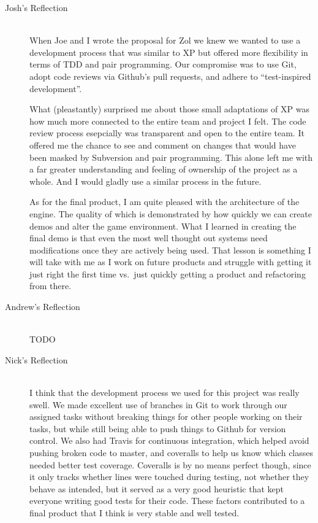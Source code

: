 \documentclass{article}
\begin{document}
		\begin{description}
			\item[Josh's Reflection] \hfill \\
			When Joe and I wrote the proposal for Zol we knew we wanted to
			use a development process that was similar to XP but offered more
			flexibility in terms of TDD and pair programming. Our compromise
			was to use Git, adopt code reviews via Github's pull requests,
			and adhere to ``test-inspired development''.

			What (pleastantly) surprised me about those small adaptations of
			XP was how much more connected to the entire team and project I
			felt. The code review process esepcially was transparent and
			open to the entire team. It offered me the chance to see and
			comment on changes that would have been masked by Subversion and
			pair programming. This alone left me with a far greater
			understanding and feeling of ownership of the project as a whole.
			And I would gladly use a similar process in the future.

			As for the final product, I am quite pleased with the architecture
			of the engine. The quality of which is demonstrated by how
			quickly we can create demos and alter the game environment. What
			I learned in creating the final demo is that even the most well
			thought out systems need modifications once they are actively
			being used. That lesson is something I will take with me as
			I work on future products and struggle with getting it just right
			the first time vs.\ just quickly getting a product and refactoring
			from there.

			\item[Andrew's Reflection] \hfill \\
			TODO

			\item[Nick's Reflection] \hfill \\
			I think that the development process we used for this project was
			really swell. We made excellent use of branches in Git to work through
			our assigned tasks without breaking things for other people working on
			their tasks, but while still being able to push things to Github for
			version control. We also had Travis for continuous integration, which
			helped avoid pushing broken code to master, and coveralls to help us
			know which classes needed better test coverage. Coveralls is by no means
			perfect though, since it only tracks whether lines were touched during
			testing, not whether they behave as intended, but it served as a very
			good heuristic that kept everyone writing good tests for their code.
			These factors contributed to a final product that I think is very stable
			and well tested.


\end{description}
\end{document}
